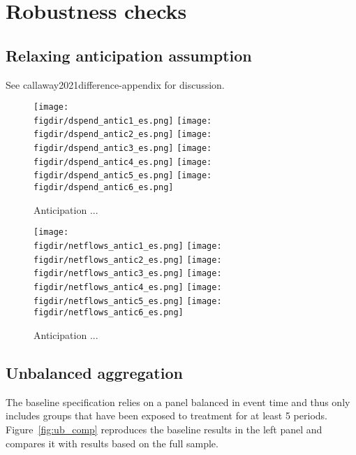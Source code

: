 
\section{Robustness checks}%
\label{sec:robustness_checks}


\subsection{Relaxing anticipation assumption}%
\label{sub:relaxing_anticipation_assumption}

See callaway2021difference-appendix for discussion.

\begin{figure}[H]
    \centering
    \caption{Anticipation ...}%
    \label{fig:new}
    \texttt{[image: \\figdir/dspend\_antic1\_es.png]}
    \texttt{[image: \\figdir/dspend\_antic2\_es.png]}
    \texttt{[image: \\figdir/dspend\_antic3\_es.png]}
    \texttt{[image: \\figdir/dspend\_antic4\_es.png]}
    \texttt{[image: \\figdir/dspend\_antic5\_es.png]}
    \texttt{[image: \\figdir/dspend\_antic6\_es.png]}
\end{figure}

\begin{figure}[H]
    \centering
    \caption{Anticipation ...}%
    \label{fig:new}
    \texttt{[image: \\figdir/netflows\_antic1\_es.png]}
    \texttt{[image: \\figdir/netflows\_antic2\_es.png]}
    \texttt{[image: \\figdir/netflows\_antic3\_es.png]}
    \texttt{[image: \\figdir/netflows\_antic4\_es.png]}
    \texttt{[image: \\figdir/netflows\_antic5\_es.png]}
    \texttt{[image: \\figdir/netflows\_antic6\_es.png]}
\end{figure}

\subsection{Unbalanced aggregation}%
\label{sub:unbalanced_aggregation}

The baseline specification relies on a panel balanced in event time and
thus only includes groups that have been exposed to treatment for at least 5
periods. Figure~\ref{fig:ub_comp} reproduces the baseline results in the left
panel and compares it with results based on the full sample.


